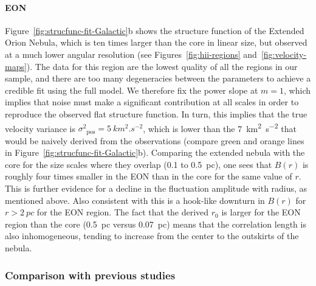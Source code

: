 \documentclass[fleqn,usenatbib, useAMS, a4paper]{mnras}
\newcommand\startNEW{\color{NEWcolor}}
\newcommand\stopNEW{\color{black}}
\newcommand\pos{\ensuremath{_{\mathrm{pos}}}}
\begin{document}
\paragraph*{EON}

Figure~\ref{fig:strucfunc-fit-Galactic}b shows the structure function of the Extended Orion Nebula, which is ten times larger than the core in linear size,
but observed at a much lower angular resolution
(see Figures~\ref{fig:hii-regions} and~\ref{fig:velocity-maps}).
The data for this region are the lowest quality of all the regions in
our sample, and there are too many degeneracies between the parameters
to achieve a credible fit using the full model.
We therefore fix the power slope at \(m = 1\),
which implies that noise must make a significant contribution at all scales
in order to reproduce the observed flat structure function.
In turn, this implies that
\startNEW
the true velocity variance is
\stopNEW
\(\sigma^2\pos = \SI{5}{km^2.s^{-2}}\),
which is lower than the \SI{7}{km^2.s^{-2}}
that would be naively derived from the observations
(compare green and orange lines in Figure~\ref{fig:strucfunc-fit-Galactic}b).
\startNEW
Comparing the extended nebula with the core for the size scales where they overlap
(\num{0.1} to \SI{0.5}{pc}), one sees that \(B(r)\) is roughly four times smaller
in the EON than in the core for the same value of \(r\).
This is further evidence for a decline in the fluctuation amplitude with radius,
as mentioned above.
Also consistent with this is a hook-like downturn in \(B(r)\) for \(r > \SI{2}{pc}\)
for the EON region.
The fact that the derived \(r_0\) is larger for the EON region than the core
(\SI{0.5}{pc} versus \SI{0.07}{pc}) means that the correlation length is also inhomogeneous,
tending to increase from the center to the outskirts of the nebula. 
\stopNEW

\startNEW
\subsubsection{Comparison with previous studies}
\label{sec:comparison-orion}
\stopNEW
\end{document}
